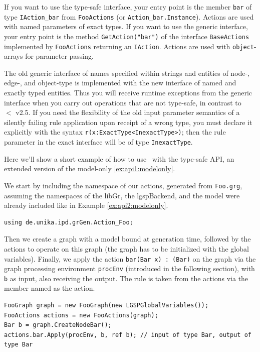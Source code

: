 \begin{note}
If you want to use the type-safe interface, your entry point is the member \texttt{bar} of type \texttt{IAction\_bar} from \texttt{FooActions} (or \texttt{Action\_bar.Instance}).
Actions are used with named parameters of exact types.
If you want to use the generic interface, your entry point is the method \texttt{GetAction("bar")} of the interface \texttt{BaseActions} implemented by \texttt{FooActions} returning an \texttt{IAction}.
Actions are used with \texttt{object}-arrays for parameter passing.
\end{note}

\begin{note}
The old generic interface of names specified within strings and entities of node-, edge-, and object-type is implemented with the new interface of named and exactly typed entities.
Thus you will receive runtime exceptions from the generic interface when you carry out operations that are not type-safe, in contrast to \GrG\ $<$ v2.5.
If you need the flexibility of the old input parameter semantics of a silently failing rule application upon receipt of a wrong type,
you must declare it explicitly with the syntax \verb#r(x:ExactType<InexactType>)#;
then the rule parameter in the exact interface will be of type \texttt{InexactType}.
\end{note}

\begin{example}\label{ex:api1}
Here we'll show a short example of how to use \GrG\ with the type-safe API, an extended version of the model-only \ref{ex:api1:modelonly}.

We start by including the namespace of our actions, generated from \texttt{Foo.grg}, assuming the namespaces of the libGr, the lgspBackend, and the model were already included like in Example \ref{ex:api2:modelonly}.
\begin{verbatim}
using de.unika.ipd.grGen.Action_Foo;
\end{verbatim}

Then we create a graph with a model bound at generation time, followed by the actions to operate on this graph (the graph has to be initialized with the global variables).
Finally, we apply the action \texttt{bar(Bar x) : (Bar)} on the graph via the graph processing environment \texttt{procEnv} (introduced in the following section), with \texttt{b} as input, also receiving the output.
The rule is taken from the actions via the member named as the action.
\begin{verbatim}
FooGraph graph = new FooGraph(new LGSPGlobalVariables());
FooActions actions = new FooActions(graph);
Bar b = graph.CreateNodeBar();
actions.bar.Apply(procEnv, b, ref b); // input of type Bar, output of type Bar
\end{verbatim}
\end{example}

